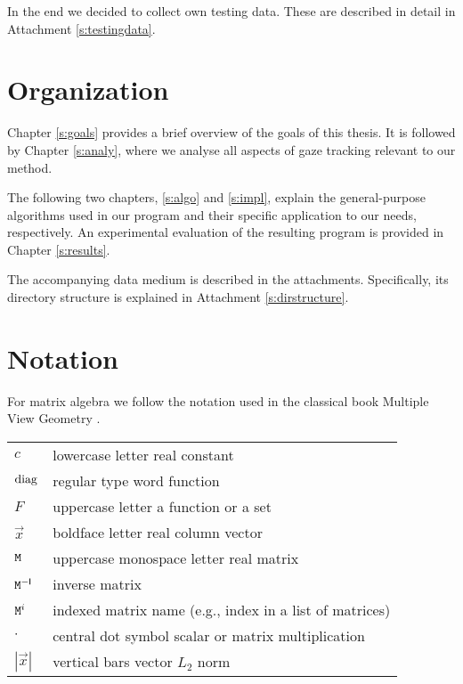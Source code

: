 In the end we decided to collect own testing data.
These are described in detail in Attachment \ref{s:testingdata}.

\section{Organization}
Chapter \ref{s:goals} provides a brief overview of the goals of this thesis.
It is followed by Chapter \ref{s:analy}, where we analyse all aspects of gaze tracking relevant to our method.

The following two chapters, \ref{s:algo} and \ref{s:impl}, explain the general-purpose algorithms used in our program and their specific application to our needs, respectively.
An experimental evaluation of the resulting program is provided in Chapter \ref{s:results}.

The accompanying data medium is described in the attachments.
Specifically, its directory structure is explained in Attachment \ref{s:dirstructure}.

\section{Notation}

For matrix algebra we follow the notation used in the classical book Multiple View Geometry \cite{hartley03}.

\begin{table}[h!]
\centering
\begin{tabularx}{\textwidth}{lX}
$c$ & lowercase letter \dotfill real constant \\
$\mathrm{diag}$ & regular type word \dotfill function \\
$F$ & uppercase letter \dotfill a function or a set \\
$\vec x$ & boldface letter \dotfill real column vector \\
$\mathtt{M}$ & uppercase monospace letter \dotfill real matrix \\
$\mathtt{M}^{-\mathsf{I}}$ & \dotfill inverse matrix \\
$\mathtt{M}^i$ & \dotfill indexed matrix name (e.g., index in a list of matrices) \\
$\cdot$ & central dot symbol \dotfill scalar or matrix multiplication \\
$|\vec x|$ & vertical bars \dotfill vector $L_2$ norm \\
\end{tabularx}
\end{table}
